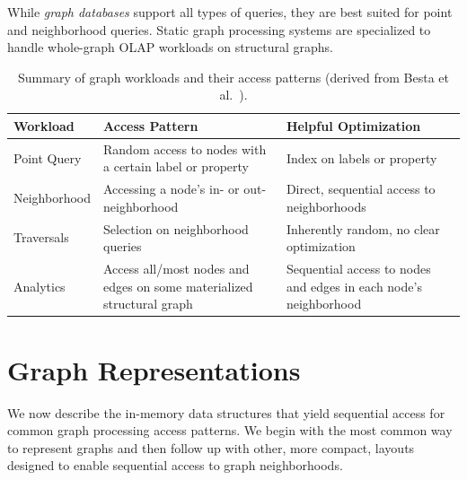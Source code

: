 While \emph{graph databases} support all types of queries, they are best suited for point and neighborhood queries.
Static graph processing systems are specialized to handle whole-graph OLAP workloads on structural graphs.

\begin{table}[h!]
  \centering
  \begin{tabularx}{\columnwidth}{@{}lXX@{}}
    \toprule
    Workload & Access Pattern & Helpful Optimization \\
    \midrule
    Point Query &
      Random access to nodes with a certain label or property &
      Index on labels or property \\
    \addlinespace
    Neighborhood &
      Accessing a node's in- or out-neighborhood &
      Direct, sequential access to neighborhoods \\
    \addlinespace
    Traversals &
      Selection on neighborhood queries &
      Inherently random, no clear optimization \\
    \addlinespace
    Analytics &
      Access all/most nodes and edges on some materialized structural graph &
      Sequential access to nodes and edges in each node's neighborhood \\
    \bottomrule
  \end{tabularx}
  \caption{Summary of graph workloads and their access patterns (derived from Besta et al.~\cite{besta2020demystifying}).}
  \label{tab:bg:workload_patterns}
\end{table}

\section{Graph Representations}
\label{sec:bg:reps}
We now describe the in-memory data structures that yield sequential access for common graph processing access patterns.
We begin with the most common way to represent graphs and then follow up with other, more compact, layouts designed to enable sequential access to graph neighborhoods.

